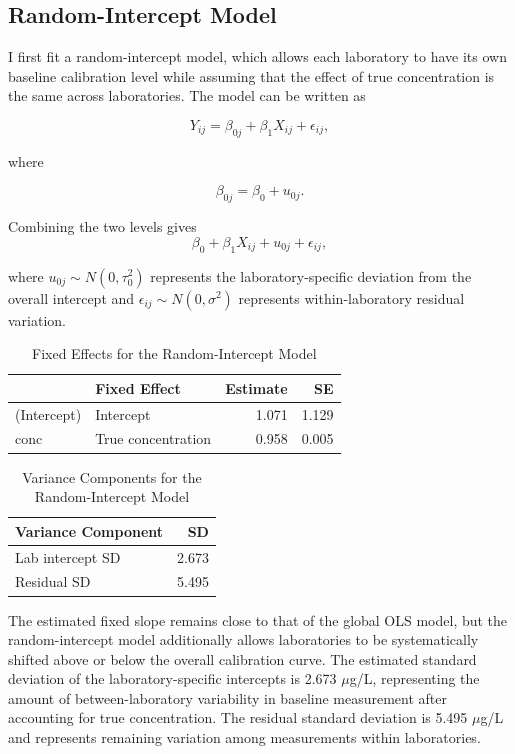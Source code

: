 \documentclass[
]{article}
\begin{document}
\subsection{Random-Intercept Model}\label{random-intercept-model}

I first fit a random-intercept model, which allows each laboratory to
have its own baseline calibration level while assuming that the effect
of true concentration is the same across laboratories. The model can be
written as

\[
Y_{ij} = \beta_{0j} + \beta_1 X_{ij} + \epsilon_{ij},
\]

where

\[
\beta_{0j} = \beta_0 + u_{0j}.
\]

Combining the two levels gives \[
\beta_0 + \beta_1 X_{ij} + u_{0j} + \epsilon_{ij},
\]

where \(u_{0j}\sim N(0,\tau_0^2)\) represents the laboratory-specific
deviation from the overall intercept and
\(\epsilon_{ij}\sim N(0,\sigma^2)\) represents within-laboratory
residual variation.

\begin{table}[!h]
\centering
\caption{\label{tab:random intercept}Fixed Effects for the Random-Intercept Model}
\centering
\begin{tabular}[t]{llrr}
\toprule
  & Fixed Effect & Estimate & SE\\
\midrule
(Intercept) & Intercept & 1.071 & 1.129\\
conc & True concentration & 0.958 & 0.005\\
\bottomrule
\end{tabular}
\end{table}

\begin{table}[!h]
\centering
\caption{\label{tab:random intercept}Variance Components for the Random-Intercept Model}
\centering
\begin{tabular}[t]{lr}
\toprule
Variance Component & SD\\
\midrule
Lab intercept SD & 2.673\\
Residual SD & 5.495\\
\bottomrule
\end{tabular}
\end{table}

The estimated fixed slope remains close to that of the global OLS model,
but the random-intercept model additionally allows laboratories to be
systematically shifted above or below the overall calibration curve. The
estimated standard deviation of the laboratory-specific intercepts is
2.673 \(\mu\)g/L, representing the amount of between-laboratory
variability in baseline measurement after accounting for true
concentration. The residual standard deviation is 5.495 \(\mu\)g/L and
represents remaining variation among measurements within laboratories.
\end{document}
